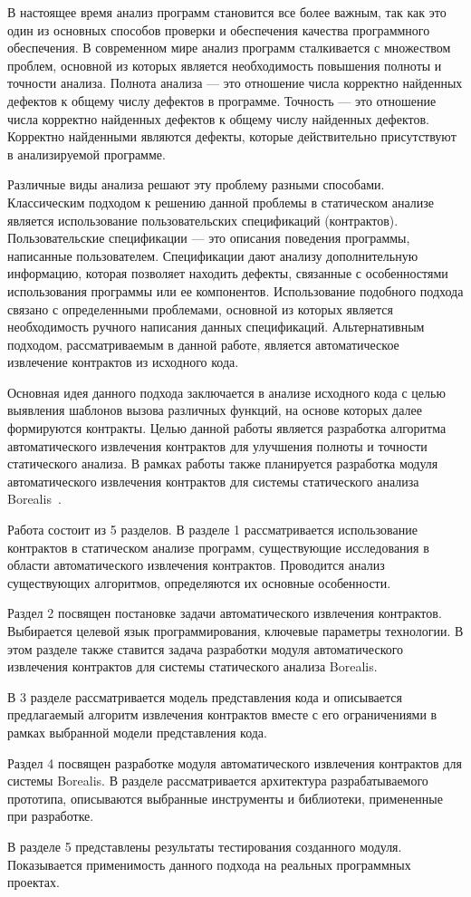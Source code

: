 \intro
В настоящее время анализ программ становится все более важным, так как это один из основных способов проверки и обеспечения качества программного обеспечения. В современном мире анализ программ сталкивается с множеством проблем, основной из которых является необходимость повышения полноты и точности анализа. Полнота анализа --- это отношение числа корректно найденных дефектов к общему числу дефектов в программе. Точность --- это отношение числа корректно найденных дефектов к общему числу найденных дефектов. Корректно найденными являются дефекты, которые действительно присутствуют в анализируемой программе.

Различные виды анализа решают эту проблему разными способами. Классическим подходом к решению данной проблемы в статическом анализе является использование пользовательских спецификаций (контрактов). Пользовательские спецификации --- это описания поведения программы, написанные пользователем. Спецификации дают анализу дополнительную информацию, которая позволяет находить дефекты, связанные с особенностями использования программы или ее компонентов. Использование подобного подхода связано с определенными проблемами, основной из которых является необходимость ручного написания данных спецификаций. Альтернативным подходом, рассматриваемым в данной работе, является автоматическое извлечение контрактов из исходного кода.

Основная идея данного подхода заключается в анализе исходного кода с целью выявления шаблонов вызова различных функций, на основе которых далее формируются контракты. Целью данной работы является разработка алгоритма автоматического извлечения контрактов для улучшения полноты и точности статического анализа. В рамках работы также планируется разработка модуля автоматического извлечения контрактов для системы статического анализа Borealis~\cite{borealis}.

Работа состоит из 5 разделов. В разделе 1 рассматривается использование контрактов в статическом анализе программ, существующие исследования в области автоматического извлечения контрактов. Проводится анализ существующих алгоритмов, определяются их основные особенности.

Раздел 2 посвящен постановке задачи автоматического извлечения контрактов. Выбирается целевой язык программирования, ключевые параметры технологии. В этом разделе также ставится задача разработки модуля автоматического извлечения контрактов для системы статического анализа Borealis.

В 3 разделе рассматривается модель представления кода и описывается предлагаемый алгоритм извлечения контрактов вместе с его ограничениями в рамках выбранной модели представления кода.

Раздел 4 посвящен разработке модуля автоматического извлечения контрактов для системы Borealis. В разделе рассматривается архитектура разрабатываемого прототипа, описываются выбранные инструменты и библиотеки, примененные при разработке.

В разделе 5 представлены результаты тестирования созданного модуля. Показывается применимость данного подхода на реальных программных проектах.
